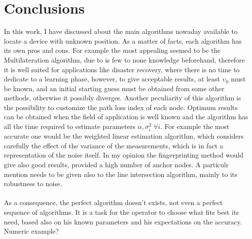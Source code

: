 \documentclass[12pt,twoside]{report}
\begin{document}
\chapter{Conclusions}
In this work, I have discussed about the main algorithms nowaday available to locate a device with unknown position. As a matter of facts, each algorithm has its own pros and cons. For example the most appealing seemed to be the Multilateration algorithm, due to is few to none knowledge beforehand, therefore it is well suited for applications like disaster recovery, where there is no time to dedicate to a learning phase, however, to give acceptable results, at least $\upsilon_0$ must be known, and an initial starting guess must be obtained from some other methods, otherwise it possibly diverges. Another peculiarity of this algorithm is the possibility to customize the path loss index of each node. Optimum results can be obtained when the field of application is well known and the algorithm has all the time required to estimate parameters $\alpha,\sigma_i^2\;\forall i$. For example the most accurate one would be the weighted linear estimation algorithm, which considers carefully the effect of the variance of the measurements, which is in fact a representation of the noise itself. In my opinion the fingerprinting method would give also good results, provided a high number of anchor nodes. A particulr mention needs to be given also to the line intersection algorithm, mainly to its robustness to noise.\\\\
As a consequence, the perfect algorithm doesn't exists, not even a perfect sequence of algorithms. It is a task for the operator to choose what fits best its need, based also on his known parameters and his expectations on the accuracy.
Numeric example?







\clearpage
\printbibliography[
heading=bibintoc,
title={Bibliography}
]


\end{document}
